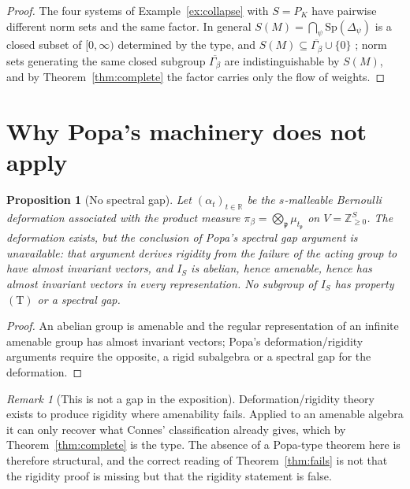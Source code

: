 \documentclass[11pt]{amsart}
\numberwithin{equation}{section}
\newtheorem{proposition}[theorem]{Proposition}
\theoremstyle{definition}
\theoremstyle{remark}
\newtheorem{remark}[theorem]{Remark}
\newcommand{\Z}{\mathbb{Z}}
\newcommand{\R}{\mathbb{R}}
\newcommand{\pp}{\mathfrak{p}}
\begin{document}
\begin{proof}
The four systems of Example~\ref{ex:collapse} with $S=P_K$ have pairwise different norm
sets and the same factor. In general $S(M)=\bigcap_{\psi}\mathrm{Sp}(\Delta_\psi)$ is a closed
subset of $[0,\infty)$ determined by the type, and $S(M)\subseteq\overline{\Gamma_\beta}\cup\{0\}$
\cite[Prop.~6.1]{Main}; norm sets generating the same closed subgroup $\overline{\Gamma_\beta}$
are indistinguishable by $S(M)$, and by Theorem~\ref{thm:complete} the factor carries only
the flow of weights.
\end{proof}

\section{Why Popa's machinery does not apply}

\begin{proposition}[No spectral gap]\label{prop:nogap}
Let $(\alpha_t)_{t\in\R}$ be the $s$-malleable Bernoulli deformation associated with the
product measure $\pi_\beta=\bigotimes_\pp\mu_{t_\pp}$ on $V=\Z_{\ge0}^S$. The deformation
exists, but the conclusion of Popa's spectral gap argument is unavailable: that argument
derives rigidity from the failure of the acting group to have almost invariant vectors, and
$I_S$ is abelian, hence amenable, hence has almost invariant vectors in every
representation. No subgroup of $I_S$ has property $(\mathrm T)$ or a spectral gap.
\end{proposition}

\begin{proof}
An abelian group is amenable and the regular representation of an infinite amenable group has
almost invariant vectors; Popa's deformation/rigidity arguments \cite{Popa} require the
opposite, a rigid subalgebra or a spectral gap for the deformation.
\end{proof}

\begin{remark}[This is not a gap in the exposition]\label{rem:notgap}
Deformation/rigidity theory exists to produce rigidity where amenability fails. Applied to an
amenable algebra it can only recover what Connes' classification already gives, which by
Theorem~\ref{thm:complete} is the type. The absence of a Popa-type theorem here is therefore
structural, and the correct reading of Theorem~\ref{thm:fails} is not that the rigidity proof
is missing but that the rigidity statement is false.
\end{remark}
\end{document}
